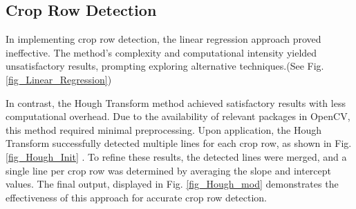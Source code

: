 \documentclass[conference]{IEEEtran}
\begin{document}
	\subsection{Crop Row Detection}
	
	In implementing crop row detection, the linear regression approach proved ineffective. The method's complexity and computational intensity yielded unsatisfactory results, prompting exploring alternative techniques.(See Fig.\ref{fig_Linear_Regression})
	
	In contrast, the Hough Transform method achieved satisfactory results with less computational overhead. Due to the availability of relevant packages in OpenCV, this method required minimal preprocessing. Upon application, the Hough Transform successfully detected multiple lines for each crop row, as shown in Fig. 
	\ref{fig_Hough_Init}
	. To refine these results, the detected lines were merged, and a single line per crop row was determined by averaging the slope and intercept values. The final output, displayed in Fig. 
	\ref{fig_Hough_mod} demonstrates the effectiveness of this approach for accurate crop row detection.
	
\end{document}
